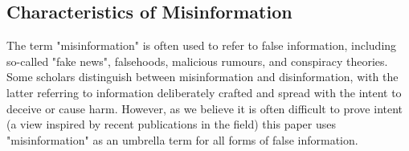\subsection{Characteristics of Misinformation}
\label{Characteristics of Misinformation}

The term "misinformation" is often used to refer to false information, including so-called "fake news", falsehoods, malicious rumours, and conspiracy theories. Some scholars distinguish between misinformation and disinformation, with the latter referring to information deliberately crafted and spread with the intent to deceive or cause harm\cite{guess2020misinformation,swire2020public}. However, as we believe it is often difficult to prove intent (a view inspired by recent publications in the field) this paper uses "misinformation" as an umbrella term for all forms of false information\cite{ecker2022psychological,southwell2019misinformation,wu2019misinformation,mitgenai2023,hartwig2024adolescents}. 


